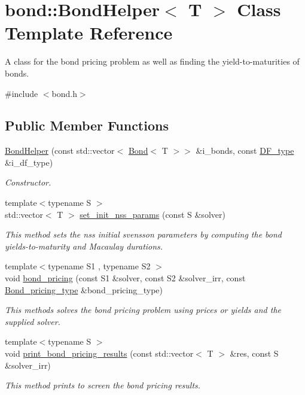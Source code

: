 \hypertarget{classbond_1_1_bond_helper}{}\section{bond\+:\+:Bond\+Helper$<$ T $>$ Class Template Reference}
\label{classbond_1_1_bond_helper}


A class for the bond pricing problem as well as finding the yield-\/to-\/maturities of bonds.  




{\ttfamily \#include $<$bond.\+h$>$}

\subsection*{Public Member Functions}
\begin{DoxyCompactItemize}
\item 
\hyperlink{classbond_1_1_bond_helper_aa86a95eaffb5a36c0ec52376b28d5d96}{Bond\+Helper} (const std\+::vector$<$ \hyperlink{classbond_1_1_bond}{Bond}$<$ T $>$$>$ \&i\+\_\+bonds, const \hyperlink{namespaceutilities_ad4290e607d0651ce53db6e5c776aca7c}{D\+F\+\_\+type} \&i\+\_\+df\+\_\+type)
\begin{DoxyCompactList}\small\item\em Constructor. \end{DoxyCompactList}\item 
{\footnotesize template$<$typename S $>$ }\\std\+::vector$<$ T $>$ \hyperlink{classbond_1_1_bond_helper_aaf31152498dbbf3704839a0c57e4555c}{set\+\_\+init\+\_\+nss\+\_\+params} (const S \&solver)
\begin{DoxyCompactList}\small\item\em This method sets the nss initial svensson parameters by computing the bond yields-\/to-\/maturity and Macaulay durations. \end{DoxyCompactList}\item 
{\footnotesize template$<$typename S1 , typename S2 $>$ }\\void \hyperlink{classbond_1_1_bond_helper_a160a6bba890e45968d11d887ff34e294}{bond\+\_\+pricing} (const S1 \&solver, const S2 \&solver\+\_\+irr, const \hyperlink{namespacebond_a7ff8132c72465682a65a634ca0958df9}{Bond\+\_\+pricing\+\_\+type} \&bond\+\_\+pricing\+\_\+type)
\begin{DoxyCompactList}\small\item\em This methods solves the bond pricing problem using prices or yields and the supplied solver. \end{DoxyCompactList}\item 
{\footnotesize template$<$typename S $>$ }\\void \hyperlink{classbond_1_1_bond_helper_a28159ce3ba6b11611d6368fd5a601f45}{print\+\_\+bond\+\_\+pricing\+\_\+results} (const std\+::vector$<$ T $>$ \&res, const S \&solver\+\_\+irr)
\begin{DoxyCompactList}\small\item\em This method prints to screen the bond pricing results. \end{DoxyCompactList}\end{DoxyCompactItemize}
